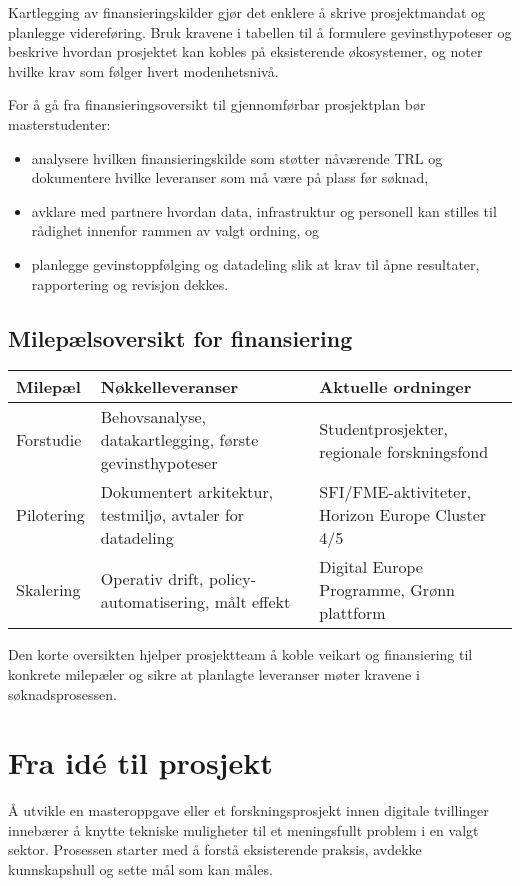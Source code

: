 Kartlegging av finansieringskilder gjør det enklere å skrive prosjektmandat og planlegge videreføring. Bruk kravene i tabellen til å formulere gevinsthypoteser og beskrive hvordan prosjektet kan kobles på eksisterende økosystemer, og noter hvilke krav som følger hvert modenhetsnivå.\citep{rcn2024programkatalog,eu2024digitaltwinroadmap,innovasjon2024gronnplattform}

For å gå fra finansieringsoversikt til gjennomførbar prosjektplan bør masterstudenter:
\begin{itemize}
    \item analysere hvilken finansieringskilde som støtter nåværende TRL og dokumentere hvilke leveranser som må være på plass før søknad,
    \item avklare med partnere hvordan data, infrastruktur og personell kan stilles til rådighet innenfor rammen av valgt ordning, og
    \item planlegge gevinstoppfølging og datadeling slik at krav til åpne resultater, rapportering og revisjon dekkes.
\end{itemize}

\subsection*{Milepælsoversikt for finansiering}
\begin{table}[h]
    \centering
    \begin{tabular}{p{3.0cm}p{5.0cm}p{4.2cm}}
        \toprule
        Milepæl & Nøkkelleveranser & Aktuelle ordninger \\
        \midrule
        Forstudie & Behovsanalyse, datakartlegging, første gevinsthypoteser & Studentprosjekter, regionale forskningsfond \\
        Pilotering & Dokumentert arkitektur, testmiljø, avtaler for datadeling & SFI/FME-aktiviteter, Horizon Europe Cluster 4/5 \\
        Skalering & Operativ drift, policy-automatisering, målt effekt & Digital Europe Programme, Grønn plattform \\
        \bottomrule
    \end{tabular}
\end{table}

Den korte oversikten hjelper prosjektteam å koble veikart og finansiering til konkrete milepæler og sikre at planlagte leveranser møter kravene i søknadsprosessen.\citep{rcn2024programkatalog,rcn2024digitalisering}

\section{Fra idé til prosjekt}
Å utvikle en masteroppgave eller et forskningsprosjekt innen digitale tvillinger innebærer å knytte tekniske muligheter til et meningsfullt problem i en valgt sektor. Prosessen starter med å forstå eksisterende praksis, avdekke kunnskapshull og sette mål som kan måles.

